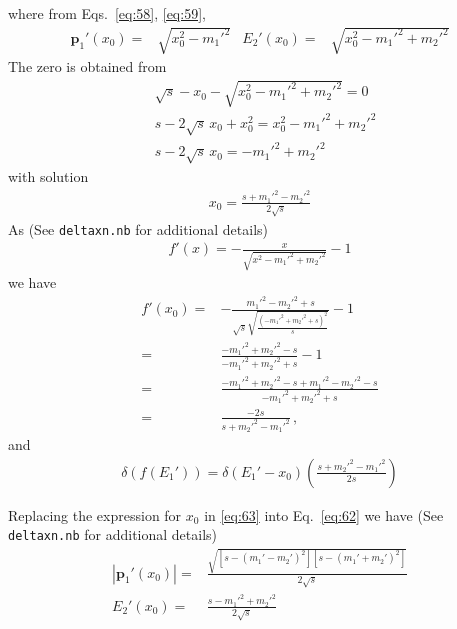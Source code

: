 where from Eqs.~\eqref{eq:58}, \eqref{eq:59},
\begin{align}
  \label{eq:62}
  \mathbf{p}_1'(x_0)=&\sqrt{x_0^2-{m_1'}^2}&
  E_2'(x_0)=&\sqrt{x_0^2-{m_1'}^2+{m_2'}^2}
\end{align}
The zero is obtained from
\begin{align}
  &\sqrt{s}-x_0-\sqrt{x_0^2-{m_1'}^2+{m_2'}^2}=0\nonumber\\
  &s-2\sqrt{s}\,x_0+x_0^2=x_0^2-{m_1'}^2+{m_2'}^2\nonumber\\
  &s-2\sqrt{s}\,x_0=-{m_1'}^2+{m_2'}^2
\end{align}
with solution
\begin{align}
  \label{eq:63}
  x_0=\frac{s+{m_1'}^2-{m_2'}^2}{2\sqrt{s}}
\end{align}
As (See 
\texttt{deltaxn.nb} %
for additional details)
\begin{align}
  f'(x)=-\frac{x}{\sqrt{x^2-{m_1'}^2+{m_2'}^2}}-1
\end{align}
we have
\begin{align}
  \label{eq:64}
  f'(x_0)=&-\frac{{m_1'}^2-{m_2'}^2+s}{\sqrt{s}
   \sqrt{\frac{\left(-{m_1'}^2+{m_2'}^2+s\right)^2}{s}}}-1\nonumber\\
    =&\frac{-{m_1'}^2+{m_2'}^2-s}{-{m_1'}^2+{m_2'}^2+s}-1\nonumber\\
    =&\frac{-{m_1'}^2+{m_2'}^2-s+{m_1'}^2-{m_2'}^2-s}{-{m_1'}^2+{m_2'}^2+s}\nonumber\\
=&\frac{-2s}{s+{m_2'}^2-{m_1'}^2}\,,
\end{align}
and
\begin{align}
  \label{eq:65}
  \delta(f(E_1'))=\delta(E_1'-x_0)\left(\frac{s+{m_2'}^2-{m_1'}^2}{2s}\right)
\end{align}

Replacing the expression for $x_0$ in \eqref{eq:63} into Eq.~\eqref{eq:62} we have (See 
\texttt{deltaxn.nb}  %
for additional details)
\begin{align}
  \label{eq:66}
   |\mathbf{p}_1'(x_0)|=&\frac{\sqrt{[s-({m_1'}-{m_2'})^2][s-({m_1'}+{m_2'})^2]}}{2\sqrt{s}}\nonumber\\
E_2'(x_0)=&  \frac{s-{m_1'}^2+{m_2'}^2}{2\sqrt{s}}
\end{align}

